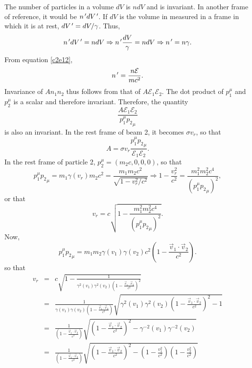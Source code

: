 \begin{enumerate}
The number of particles in a volume $dV$ is $ndV$ and is invariant. In another
frame of reference, it would be $n^{\,\prime} dV^{\,\prime}$. If $dV$ is the volume in measured
in a frame in which it is at rest, $dV^{\,\prime} = dV/\gamma$. Thus,
\begin{equation}\label{c2e48}
n^{\,\prime} dV^{\,\prime} = n dV \Rightarrow n^{\,\prime}\frac{dV}{\gamma} = ndV \Rightarrow n^{\,\prime}
= n\gamma.
\end{equation}
From equation \eqref{c2e12}, 
\begin{equation}\label{c2e49}
n^{\,\prime} = \frac{n\mathcal{E}}{mc^2}.
\end{equation}
Invariance of $An_1n_2$ thus follows from that of $A\mathcal{E}_1\mathcal{E}_2$. 
The dot product of $p_1^\mu$ and $p_2^\mu$ is a scalar and therefore invariant.
Therefore, the quantity
\[
\frac{A\mathcal{E}_1\mathcal{E}_2}{p_1^\mu {p_2}_\mu}
\]
is also an invariant. In the rest frame of beam 2, it becomes $\sigma v_r$, so that
\begin{equation}\label{c2e50}
A = \sigma v_r\frac{p_1^\mu {p_2}_\mu}{\mathcal{E}_1\mathcal{E}_2}.
\end{equation}
In the rest frame of particle 2, $p_2^\mu = (m_2c, 0, 0, 0)$, so that 
\[
p_1^\mu {p_2}_\mu = m_1\gamma(v_r) m_2 c^2 = 
\frac{m_1m_2c^2}{\sqrt{1 - v_r^2/c^2}} \Rightarrow 1 - \frac{v_r^2}{c^2} = 
\frac{m_1^2m_2^2c^4}{(p_1^\mu {p_2}_\mu)^2},
\]
or that
\begin{equation}\label{c2e51}
v_r = c\sqrt{1 - \frac{m_1^2m_2^2c^4}{(p_1^\mu {p_2}_\mu)^2}}.
\end{equation}
Now, 
\[
p_1^\mu {p_2}_\mu = m_1m_2\gamma(v_1)\gamma(v_2)c^2\left(1 - \frac{\vec{v}_1\cdot\vec{v}_2}{c^2}\right).
\]
so that
\begin{eqnarray*}
v_r &=& c\sqrt{1 - \frac{1}{\gamma^2(v_1)\gamma^2(v_2)\left(1 - \frac{\vec{v}_1\cdot\vec{v}_2}{c^2}\right)^2}} \\
 &=& \frac{1}{\gamma(v_1)\gamma(v_2)\left(1 - \frac{\vec{v}_1\cdot\vec{v}_2}{c^2}\right)}
 \sqrt{\gamma^2(v_1)\gamma^2(v_2)\left(1 - \frac{\vec{v}_1\cdot\vec{v}_2}{c^2}\right)^2 - 1} \\
 &=& \frac{1}{\left(1 - \frac{\vec{v}_1\cdot\vec{v}_2}{c^2}\right)}
 \sqrt{\left(1 - \frac{\vec{v}_1\cdot\vec{v}_2}{c^2}\right)^2 - \gamma^{-2}(v_1)\gamma^{-2}(v_2)} \\
 &=& \frac{1}{\left(1 - \frac{\vec{v}_1\cdot\vec{v}_2}{c^2}\right)}
 \sqrt{\left(1 - \frac{\vec{v}_1\cdot\vec{v}_2}{c^2}\right)^2 - \left(1 - \frac{v_1^2}{c^2}\right)
 \left(1 - \frac{v_2^2}{c^2}\right)}
\end{eqnarray*}

\end{enumerate}
